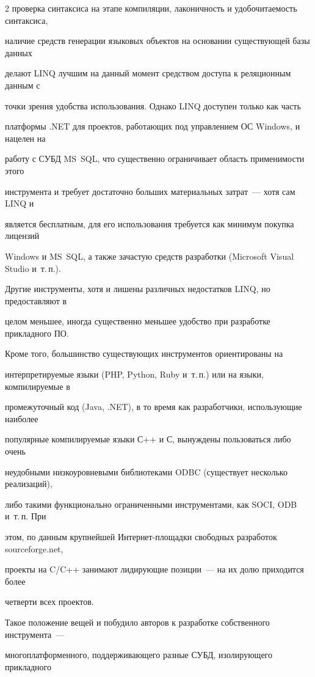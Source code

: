 \begin{multicols}{2}
проверка синтаксиса на этапе компиляции, лаконичность и удобочитаемость синтаксиса, 

наличие средств генерации языковых объектов на основании существующей базы данных 

делают LINQ лучшим на данный момент средством доступа к реляционным данным с 

точки зрения удобства использования. Однако LINQ доступен только как часть 

платформы .NET для проектов, работающих под управлением ОС Windows, и нацелен на 

работу с СУБД MS~SQL, что существенно ограничивает область применимости этого 

инструмента и требует достаточно больших материальных затрат~--- хотя сам LINQ и 

является бесплатным, для его использования требуется как минимум покупка лицензий 

Windows и MS~SQL, а также зачастую средств разработки (Microsoft Visual Studio и~т.\,п.).



Другие инструменты, хотя и лишены различных недостатков LINQ, но предоставляют в 

целом меньшее, иногда существенно меньшее удобство при разработке прикладного ПО. 

Кроме того, большинство существующих инструментов ориентированы на 

интерпретируемые языки (PHP, Python, Ruby и~т.\,п.) или на языки, компилируемые в 

промежуточный код (Java, .NET), в то время как разработчики, использующие наиболее 

популярные компилируемые языки С++ и С, вынуждены пользоваться либо очень 

неудобными низкоуровневыми библиотеками ODBC (существует несколько реализаций), 

либо такими функционально ограниченными инструментами, как SOCI, ODB и~т.\,п. При 

этом, по данным крупнейшей Интернет-площадки свободных разработок sourceforge.net, 

проекты на C/C++ занимают лидирующие позиции~--- на их долю приходится более 

четверти всех проектов.



Такое положение вещей и побудило авторов к разработке собственного инструмента~--- 

многоплатформенного, поддерживающего разные СУБД, изолирующего прикладного 


\end{multicols}
